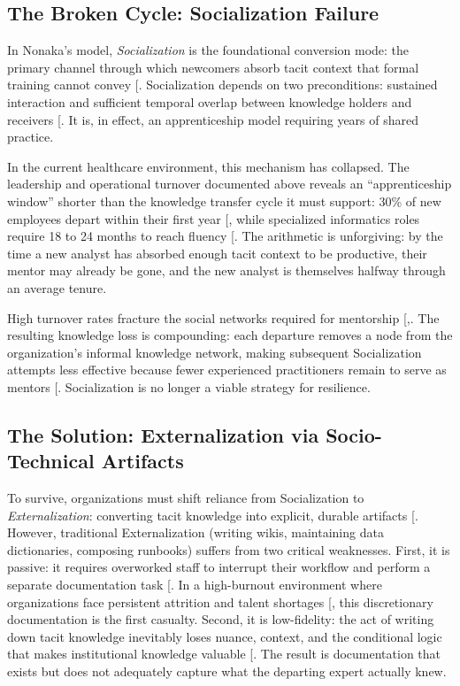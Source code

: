 \documentclass[
  american,
  11pt,
  letterpaper,
  oneside  ,captions=tableheading
]{scrartcl}
\begin{document}
\subsection{The Broken Cycle: Socialization
Failure}\label{the-broken-cycle-socialization-failure}

In Nonaka's model, \emph{Socialization} is the foundational conversion
mode: the primary channel through which newcomers absorb tacit context
that formal training cannot convey {[}\citeproc{ref-farnese2019}{20}{]}.
Socialization depends on two preconditions: sustained interaction and
sufficient temporal overlap between knowledge holders and receivers
{[}\citeproc{ref-foos2006}{22}{]}. It is, in effect, an apprenticeship
model requiring years of shared practice.

In the current healthcare environment, this mechanism has collapsed. The
leadership and operational turnover documented above reveals an
``apprenticeship window'' shorter than the knowledge transfer cycle it
must support: 30\% of new employees depart within their first year
{[}\citeproc{ref-nsi2025}{23}{]}, while specialized informatics roles
require 18 to 24 months to reach fluency
{[}\citeproc{ref-ledikwe2013}{17}{]}. The arithmetic is unforgiving: by
the time a new analyst has absorbed enough tacit context to be
productive, their mentor may already be gone, and the new analyst is
themselves halfway through an average tenure.

High turnover rates fracture the social networks required for mentorship
{[},\citeproc{ref-wu2024}{8}{]}. The resulting
knowledge loss is compounding: each departure removes a node from the
organization's informal knowledge network, making subsequent
Socialization attempts less effective because fewer experienced
practitioners remain to serve as mentors
{[}\citeproc{ref-massingham2018}{24}{]}. Socialization is no longer a
viable strategy for resilience.

\subsection{The Solution: Externalization via Socio-Technical
Artifacts}\label{the-solution-externalization-via-socio-technical-artifacts}

To survive, organizations must shift reliance from Socialization to
\emph{Externalization}: converting tacit knowledge into explicit,
durable artifacts {[}\citeproc{ref-zhang2025}{25}{]}. However,
traditional Externalization (writing wikis, maintaining data
dictionaries, composing runbooks) suffers from two critical weaknesses.
First, it is passive: it requires overworked staff to interrupt their
workflow and perform a separate documentation task
{[}\citeproc{ref-goffin2011}{26}{]}. In a high-burnout environment where
organizations face persistent attrition and talent shortages
{[}\citeproc{ref-himssworkforce2024}{27}{]}, this discretionary
documentation is the first casualty. Second, it is low-fidelity: the act
of writing down tacit knowledge inevitably loses nuance, context, and
the conditional logic that makes institutional knowledge valuable
{[}\citeproc{ref-foos2006}{22}{]}. The result is documentation that
exists but does not adequately capture what the departing expert
actually knew.
\end{document}
